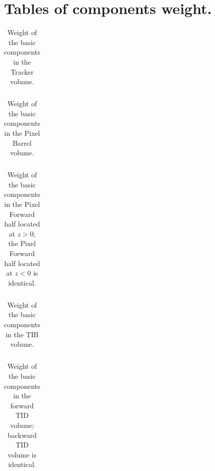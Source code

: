 \documentclass{cmspaper}
\begin{document}
\clearpage

\appendix
\section{Tables of components weight.}
\label{compositionAppendix}

\vskip 1cm

\begin{table}[h]
\begin{center}
\begin{tabular}{clrrrrrr}

\end{tabular}
\caption{Weight of the basic components in the Tracker volume.}
\label{table:Tracker}
\end{center}
\end{table}

\begin{table}[h]
\begin{center}
\begin{tabular}{clrrrrrr}

\end{tabular}
\caption{Weight of the basic components in the Pixel Barrel volume.}
\end{center}
\end{table}

\begin{table}[h]
\begin{center}
\begin{tabular}{clrrrrrr}

\end{tabular}
\caption{Weight of the basic components in the Pixel Forward half located at $z>0$; the Pixel Forward half located at $z<0$ is identical.}
\end{center}
\end{table}

\begin{table}[h]
\begin{center}
\begin{tabular}{clrrrrrr}

\end{tabular}
\caption{Weight of the basic components in the TIB volume.}
\end{center}
\end{table}

\begin{table}[h]
\begin{center}
\begin{tabular}{clrrrrrr}

\end{tabular}
\caption{Weight of the basic components in the forward TID volume; backward TID volume is identical.}
\end{center}
\end{table}
\end{document}
